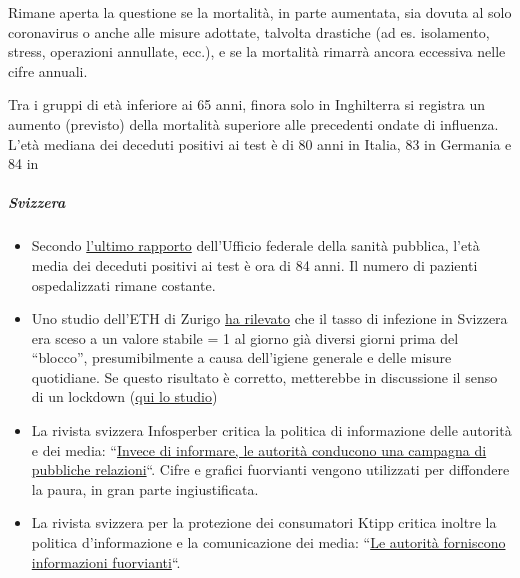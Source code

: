Rimane aperta la questione se la mortalità, in parte aumentata, sia
dovuta al solo coronavirus o anche alle misure adottate, talvolta
drastiche (ad es. isolamento, stress, operazioni annullate, ecc.), e se
la mortalità rimarrà ancora eccessiva nelle cifre annuali.

Tra i gruppi di età inferiore ai 65 anni, finora solo in Inghilterra si
registra un aumento (previsto) della mortalità superiore alle precedenti
ondate di influenza. L'età mediana dei deceduti positivi ai test è di 80
anni in Italia, 83 in Germania e 84 in

\hypertarget{svizzera-1}{%
\subparagraph{\texorpdfstring{\textbf{Svizzera}}{Svizzera}}\label{svizzera-1}}

\begin{itemize}
\tightlist
\item
  Secondo
  \href{https://www.bag.admin.ch/bag/it/home/krankheiten/ausbrueche-epidemien-pandemien/aktuelle-ausbrueche-epidemien/novel-cov/situation-schweiz-und-international.html}{l'ultimo
  rapporto} dell'Ufficio federale della sanità pubblica, l'età media dei
  deceduti positivi ai test è ora di 84 anni. Il numero di pazienti
  ospedalizzati rimane costante.
\item
  Uno studio dell'ETH di Zurigo
  \href{https://www.tagesanzeiger.ch/ansteckungsraten-flachten-bereits-vor-dem-lockdown-ab-809893127675}{ha
  rilevato} che il tasso di infezione in Svizzera era sceso a un valore
  stabile = 1 al giorno già diversi giorni prima del ``blocco'',
  presumibilmente a causa dell'igiene generale e delle misure
  quotidiane. Se questo risultato è corretto, metterebbe in discussione
  il senso di un lockdown
  (\href{https://bsse.ethz.ch/cevo/research/sars-cov-2/real-time-monitoring-in-switzerland.html}{qui
  lo studio})
\item
  La rivista svizzera Infosperber critica la politica di informazione
  delle autorità e dei media:
  ``\href{https://www.infosperber.ch/Artikel/Gesundheit/Corona-Statt-zu-informieren-fuhren-Behorden-eine-PR-Kampagne}{Invece
  di informare, le autorità conducono una campagna di pubbliche
  relazioni}``. Cifre e grafici fuorvianti vengono utilizzati per
  diffondere la paura, in gran parte ingiustificata.
\item
  La rivista svizzera per la protezione dei consumatori Ktipp critica
  inoltre la politica d'informazione e la comunicazione dei media:
  ``\href{https://www.ktipp.ch/artikel/artikeldetail/behoerden-informieren-irrefuehrend/}{Le
  autorità forniscono informazioni fuorvianti}``.

\end{itemize}
